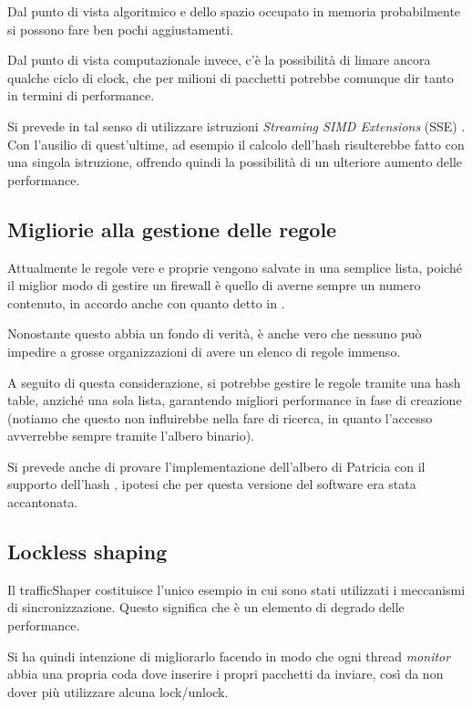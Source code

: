 Dal punto di vista algoritmico e dello spazio occupato in memoria probabilmente si possono fare ben pochi aggiustamenti.

Dal punto di vista computazionale invece, c'è la possibilità di limare ancora qualche ciclo di clock, che per milioni di pacchetti potrebbe comunque dir tanto in termini di performance.

Si prevede in tal senso di utilizzare istruzioni \emph{Streaming SIMD Extensions} (SSE) \cite{sse}. Con l'ausilio di quest'ultime, ad esempio il calcolo dell'hash risulterebbe fatto con una singola istruzione, offrendo quindi la possibilità di un ulteriore aumento delle performance.

\subsection{Migliorie alla gestione delle regole}

Attualmente le regole vere e proprie vengono salvate in una semplice lista, poiché il miglior modo di gestire un firewall è quello di averne sempre un numero contenuto, in accordo anche con quanto detto in \cite{fsr}.

Nonostante questo abbia un fondo di verità, è anche vero che nessuno può impedire a grosse organizzazioni di avere un elenco di regole immenso.

A seguito di questa considerazione, si potrebbe gestire le regole tramite una hash table, anziché una sola lista, garantendo migliori performance in fase di creazione (notiamo che questo non influirebbe nella fare di ricerca, in quanto l'accesso avverrebbe sempre tramite l'albero binario).

Si prevede anche di provare l'implementazione dell'albero di Patricia con il supporto dell'hash \cite{hpt,hat}, ipotesi che per questa versione del software era stata accantonata.

\subsection{Lockless shaping}

Il trafficShaper costituisce l'unico esempio in cui sono stati utilizzati i meccanismi di sincronizzazione. Questo significa che è un elemento di degrado delle performance.

Si ha quindi intenzione di migliorarlo facendo in modo che ogni thread \emph{monitor} abbia una propria coda dove inserire i propri pacchetti da inviare, così da non dover più utilizzare alcuna lock/unlock.

